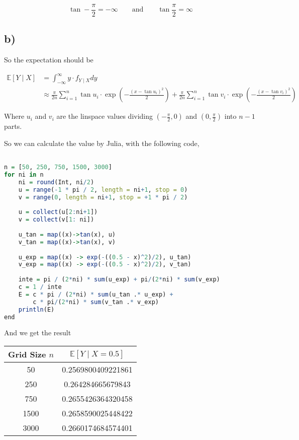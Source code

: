 \documentclass[12pt]{article}
\begin{document}
\begin{flushleft}
$$
\tan -\frac{\pi}{2} = -\infty \qquad \text{and} \qquad  \tan \frac{\pi}{2} = \infty
$$

\subsection*{b)}

\qquad So the expectation should be

\begin{align*}
\mathbb{E} \left[ Y\mid X \right] &= \int_{-\infty}^{\infty} y \cdot f_{Y\mid X} dy\\
& \approx \frac{\pi}{2n}\sum_{i=1}^n \tan u_i \cdot \exp(-\frac{(x - \tan u_i)^2}{2}) + \frac{\pi}{2n}\sum_{i=1}^n \tan v_i \cdot \exp(-\frac{(x - \tan v_i)^2}{2})
\end{align*}

\qquad Where $u_i$ and $v_i$ are the linspace values dividing $(-\frac{\pi}{2}, 0)$ and $(0, \frac{\pi}{2})$ into $n-1$ parts.

\newpage

\qquad So we can calculate the value by Julia, with the following code,

\begin{lstlisting}[language=R]

n = [50, 250, 750, 1500, 3000]
for ni in n
    ni = round(Int, ni/2)
    u = range(-1 * pi / 2, length = ni+1, stop = 0)
    v = range(0, length = ni+1, stop = +1 * pi / 2)
        
    u = collect(u[2:ni+1])
    v = collect(v[1: ni])
        
    u_tan = map((x)->tan(x), u)
    v_tan = map((x)->tan(x), v)
        
    u_exp = map((x) -> exp(-((0.5 - x)^2)/2), u_tan)
    v_exp = map((x) -> exp(-((0.5 - x)^2)/2), v_tan)
        
    inte = pi / (2*ni) * sum(u_exp) + pi/(2*ni) * sum(v_exp)
    c = 1 / inte
    E = c * pi / (2*ni) * sum(u_tan .* u_exp) + 
        c * pi/(2*ni) * sum(v_tan .* v_exp)
    println(E)
end        
\end{lstlisting} 
    

\qquad And we get the result

\begin{table}[h]
\centering
\begin{tabular}{cc}
\hline
Grid Size $n$ & $\mathbb{E}\left[Y\mid X = 0.5\right]$ \\
\hline
50    &  0.2569800409221861  \\
250   &  0.264284665679843   \\
750   &  0.2655426364320458  \\
1500  &  0.2658590025448422  \\
3000  &  0.2660174684574401  \\
\hline
\end{tabular}
\end{table}


\end{flushleft}
\end{document}
